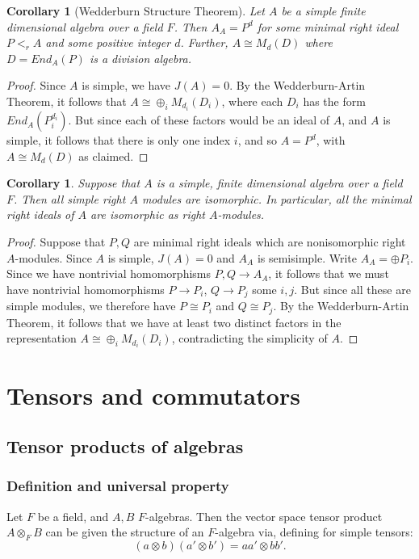 \documentclass[12pt]{report}
\theoremstyle{plain}
\newtheorem{cor}[thm]{Corollary}
\begin{document}
\begin{cor}[Wedderburn Structure Theorem] \label{simple wedderburn}
Let $A$ be a simple finite dimensional algebra over a field $F$. Then $A_A
= P^d$ for some minimal right ideal $P <_r A$ and some positive integer $d$.
Further, $A
\cong M_d(D)$ where $D = End_A(P)$ is a division algebra.
\end{cor}
\begin{proof}
Since $A$ is simple, we have $J(A) = 0$. By the Wedderburn-Artin Theorem,
it follows that $A \cong \oplus_i M_{d_i}(D_i)$, where each $D_i$ has the
form $End_A(P_i^{d_i})$. But since each of these factors would be an ideal
of $A$, and $A$ is simple, it follows that there is only one index $i$, and
so $A = P^d$, with $A \cong M_d(D)$ as claimed.
\end{proof}

\begin{cor} \label{unique simple module} 
Suppose that $A$ is a simple, finite dimensional algebra over a field $F$.
Then all simple right $A$ modules are isomorphic. In particular, all the
minimal right ideals of $A$ are isomorphic as right $A$-modules.
\end{cor}
\begin{proof}
Suppose that $P, Q$ are minimal right ideals which are nonisomorphic right
$A$-modules.  Since $A$ is simple, $J(A) = 0$ and $A_A$ is semisimple.
Write $A_A = \oplus P_i$. Since we have nontrivial homomorphisms $P, Q \to
A_A$, it follows that we must have nontrivial homomorphisms $P \to P_i$,
$Q \to P_j$ some $i, j$. But since all these are simple modules, we
therefore have $P \cong P_i$ and $Q \cong P_j$. By the Wedderburn-Artin
Theorem, it follows that we have at least two distinct factors in the
representation $A \cong \oplus_i M_{d_i}(D_i)$, contradicting the
simplicity of $A$.
\end{proof}

\section{Tensors and commutators}

\subsection{Tensor products of algebras}

\subsubsection{Definition and universal property} 
Let $F$ be a field, and $A, B$ $F$-algebras. Then the vector space tensor
product $A \otimes_F B$ can be given the structure of an $F$-algebra via,
defining for simple tensors:
\[(a \otimes b)(a' \otimes b') = aa' \otimes bb'.\]
\end{document}
